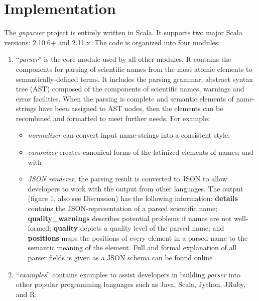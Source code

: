 \documentclass{bmcart}
\begin{document}
\section*{Implementation}

The \textit{gnparser} project is entirely written in Scala. It supports two
major Scala versions: 2.10.6+ and 2.11.x. The code is organized into four
modules:

\begin{enumerate}

  \item ``\textit{parser}'' is the core module used by all other modules. It
    contains the components for parsing of scientific names from the most atomic elements to semantically-defined terms. It includes the parsing
    grammar, abstract syntax tree (AST) composed of the components of scientific names, warnings and error facilities.  When the
    parsing is complete and semantic elements of name-strings have been assigned to AST nodes, 
    then the elements can be recombined and formatted to meet further needs.  For
    example:

\begin{itemize}

  \item \textit{normalizer} can convert input name-strings into a consistent style;

  \item \textit{canonizer} creates canonical forms of the latinized elements of names; and with

  \item \textit{JSON renderer}, the parsing result is converted to JSON
    \cite{bray2014javascript} to allow developers to work with the output from other languages. The output (figure 1, also see Discussion) has the following information: \textbf{details} contains the JSON-representation of a parsed scientific name; \textbf{quality\_warnings} describes potential problems if names are not well-formed; \textbf{quality} depicts a quality level of the parsed name;  and \textbf{positions} maps the positions of every element in a parsed name to the semantic meaning of the element. Full and formal explanation of all parser fields is given as a JSON schema
can be found online \cite{gnparser-json}.

\end{itemize}

  \item ``\textit{examples}'' contains  examples to assist developers in
    building \textit{parser} into other popular programming languages such as Java,
    Scala, Jython, JRuby, and R.


\end{enumerate}
\end{document}
